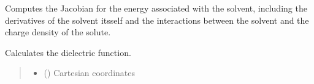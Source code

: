 \documentclass[letterpaper,10pt,english]{sphinxmanual}
\begin{document}
\begin{fulllineitems}
\begin{fulllineitems}
\label{\detokenize{fcdft.solvent:fcdft.solvent.pbe.PBE.energy_osm}}
\pysigstartsignatures
\pysiglinewithargsret
{}
{\sphinxparamcomma {}\sphinxparamcomma {}\sphinxparamcomma {}\sphinxparamcomma {}\sphinxparamcomma {}}
{}
\pysigstopsignatures
\end{fulllineitems}


\begin{fulllineitems}
\label{\detokenize{fcdft.solvent:fcdft.solvent.pbe.PBE.grad}}
\pysigstartsignatures
\pysiglinewithargsret
{}
{}
{}
\pysigstopsignatures
\sphinxAtStartPar
Computes the Jacobian for the energy associated with the solvent,
including the derivatives of the solvent itsself and the interactions
between the solvent and the charge density of the solute.

\end{fulllineitems}


\begin{fulllineitems}
\label{\detokenize{fcdft.solvent:fcdft.solvent.pbe.PBE.make_eps}}
\pysigstartsignatures
\pysiglinewithargsret
{}
{\sphinxparamcomma {}\sphinxparamcomma {}\sphinxparamcomma {}\sphinxparamcomma {}\sphinxparamcomma {}}
{}
\pysigstopsignatures
\sphinxAtStartPar
Calculates the dielectric function.
\begin{quote}\begin{description}
\begin{itemize}
\item {} 
\sphinxAtStartPar
{} () \textendash{} Cartesian coordinates


\end{itemize}
\end{description}
\end{quote}
\end{fulllineitems}
\end{fulllineitems}
\end{document}
